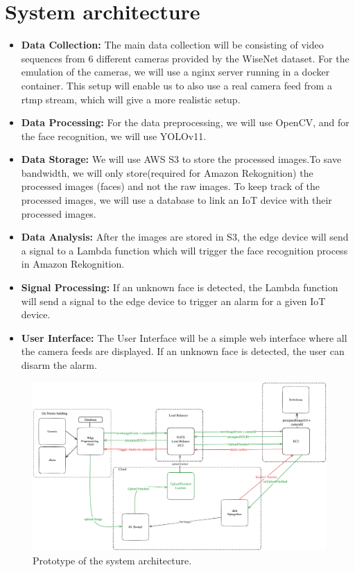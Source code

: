 \documentclass[conference]{IEEEtran}
\begin{document}
\section{System architecture}
\begin{itemize}
      \item \textbf{Data Collection:} The main data collection will be consisting of video sequences from 6 different cameras provided by the WiseNet dataset.
            For the emulation of the cameras, we will use a nginx server running in a docker container. This setup will
            enable us to also use a real camera feed from a rtmp stream, which will give a more realistic setup.
      \item \textbf{Data Processing:} For the data preprocessing, we will use OpenCV, and for the face recognition, we will use YOLOv11.
      \item \textbf{Data Storage:} We will use AWS S3 to store the processed images.To save bandwidth, we will only store(required for Amazon Rekognition) the processed images (faces)
            and not the raw images. To keep track of the processed images, we will use a database to link an IoT device with their processed images.
      \item \textbf{Data Analysis:} After the images are stored in S3, the edge device will send a signal to a Lambda function which will trigger the face recognition
            process in Amazon Rekognition.
      \item \textbf{Signal Processing:} If an unknown face is detected, the Lambda function will send a signal to the edge device to trigger an alarm for a given IoT device.
      \item \textbf{User Interface:} The User Interface will be a simple web interface where all the camera feeds are displayed. If an unknown face is detected, the user can disarm the alarm.

\end{itemize}

\begin{figure}[h!]
      \centering
      \includegraphics[width=1\linewidth]{images/architecturev2.excalidraw.png}
      \caption{Prototype of the system architecture.}
      \label{fig:enter-label}
\end{figure}
\end{document}
